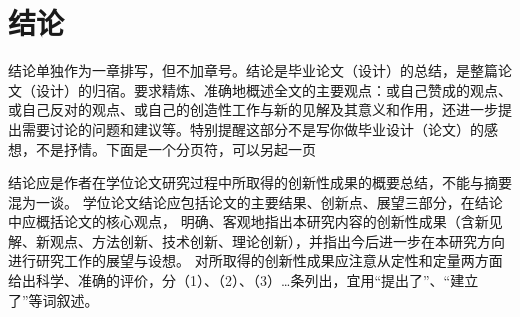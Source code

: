 \chapter*{结\quad 论}
结论单独作为一章排写，但不加章号。结论是毕业论文（设计）的总结，是整篇论文（设计）的归宿。要求精炼、准确地概述全文的主要观点：或自己赞成的观点、或自己反对的观点、或自己的创造性工作与新的见解及其意义和作用，还进一步提出需要讨论的问题和建议等。特别提醒这部分不是写你做毕业设计（论文）的感想，不是抒情。下面是一个分页符，可以另起一页

结论应是作者在学位论文研究过程中所取得的创新性成果的概要总结，不能与摘要混为一谈。
学位论文结论应包括论文的主要结果、创新点、展望三部分，在结论中应概括论文的核心观点，
明确、客观地指出本研究内容的创新性成果（含新见解、新观点、方法创新、技术创新、理论创新），并指出今后进一步在本研究方向进行研究工作的展望与设想。
对所取得的创新性成果应注意从定性和定量两方面给出科学、准确的评价，分（1）、（2）、（3）…条列出，宜用“提出了”、“建立了”等词叙述。